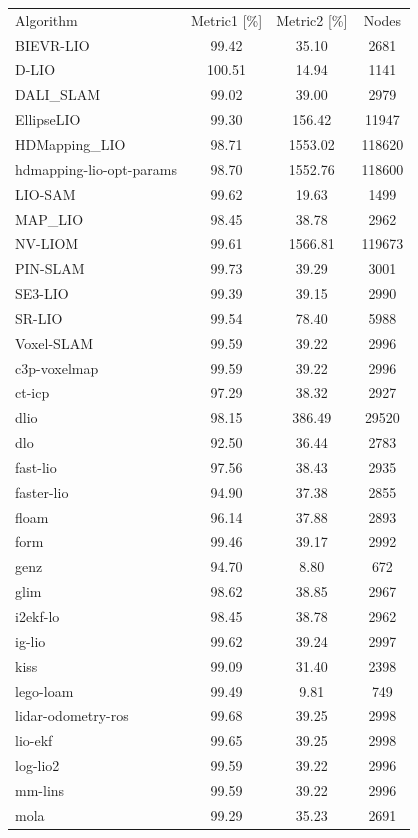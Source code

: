 \begin{table}[]
\centering
\begin{tabular}{lccc}
\rowcolor[HTML]{C0C0C0}
Algorithm & Metric1 [\%] & Metric2 [\%] & Nodes \\
BIEVR-LIO & 99.42 & 35.10 & 2681 \\
D-LIO & 100.51 & 14.94 & 1141 \\
DALI_SLAM & 99.02 & 39.00 & 2979 \\
EllipseLIO & 99.30 & 156.42 & 11947 \\
HDMapping_LIO & 98.71 & 1553.02 & 118620 \\
hdmapping-lio-opt-params & 98.70 & 1552.76 & 118600 \\
LIO-SAM & 99.62 & 19.63 & 1499 \\
MAP_LIO & 98.45 & 38.78 & 2962 \\
NV-LIOM & 99.61 & 1566.81 & 119673 \\
PIN-SLAM & 99.73 & 39.29 & 3001 \\
SE3-LIO & 99.39 & 39.15 & 2990 \\
SR-LIO & 99.54 & 78.40 & 5988 \\
Voxel-SLAM & 99.59 & 39.22 & 2996 \\
c3p-voxelmap & 99.59 & 39.22 & 2996 \\
ct-icp & 97.29 & 38.32 & 2927 \\
dlio & 98.15 & 386.49 & 29520 \\
dlo & 92.50 & 36.44 & 2783 \\
fast-lio & 97.56 & 38.43 & 2935 \\
faster-lio & 94.90 & 37.38 & 2855 \\
floam & 96.14 & 37.88 & 2893 \\
form & 99.46 & 39.17 & 2992 \\
genz & 94.70 & 8.80 & 672 \\
glim & 98.62 & 38.85 & 2967 \\
i2ekf-lo & 98.45 & 38.78 & 2962 \\
ig-lio & 99.62 & 39.24 & 2997 \\
kiss & 99.09 & 31.40 & 2398 \\
lego-loam & 99.49 & 9.81 & 749 \\
lidar-odometry-ros & 99.68 & 39.25 & 2998 \\
lio-ekf & 99.65 & 39.25 & 2998 \\
log-lio2 & 99.59 & 39.22 & 2996 \\
mm-lins & 99.59 & 39.22 & 2996 \\
mola & 99.29 & 35.23 & 2691 \\

\end{tabular}
\end{table}
